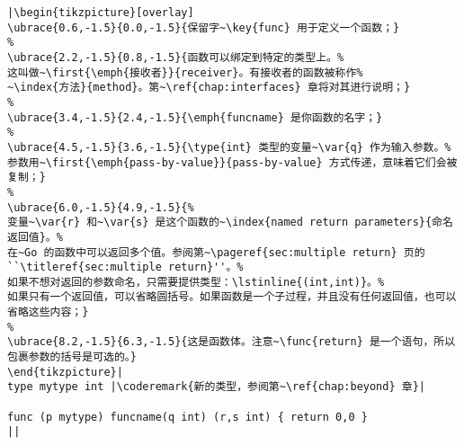 \begin{lstlisting}[caption=函数定义,label=src:function definition]
|\begin{tikzpicture}[overlay]
\ubrace{0.6,-1.5}{0.0,-1.5}{保留字~\key{func} 用于定义一个函数；}
%
\ubrace{2.2,-1.5}{0.8,-1.5}{函数可以绑定到特定的类型上。%
这叫做~\first{\emph{接收者}}{receiver}。有接收者的函数被称作%
~\index{方法}{method}。第~\ref{chap:interfaces} 章将对其进行说明；}
%
\ubrace{3.4,-1.5}{2.4,-1.5}{\emph{funcname} 是你函数的名字；}
%
\ubrace{4.5,-1.5}{3.6,-1.5}{\type{int} 类型的变量~\var{q} 作为输入参数。%
参数用~\first{\emph{pass-by-value}}{pass-by-value} 方式传递，意味着它们会被复制；}
%
\ubrace{6.0,-1.5}{4.9,-1.5}{%
变量~\var{r} 和~\var{s} 是这个函数的~\index{named return parameters}{命名返回值}。%
在~Go 的函数中可以返回多个值。参阅第~\pageref{sec:multiple return} 页的``\titleref{sec:multiple return}''。%
如果不想对返回的参数命名，只需要提供类型：\lstinline{(int,int)}。%
如果只有一个返回值，可以省略圆括号。如果函数是一个子过程，并且没有任何返回值，也可以省略这些内容；}
%
\ubrace{8.2,-1.5}{6.3,-1.5}{这是函数体。注意~\func{return} 是一个语句，所以包裹参数的括号是可选的。}
\end{tikzpicture}|
type mytype int	|\coderemark{新的类型，参阅第~\ref{chap:beyond} 章}|

func (p mytype) funcname(q int) (r,s int) { return 0,0 }
||
\end{lstlisting}
